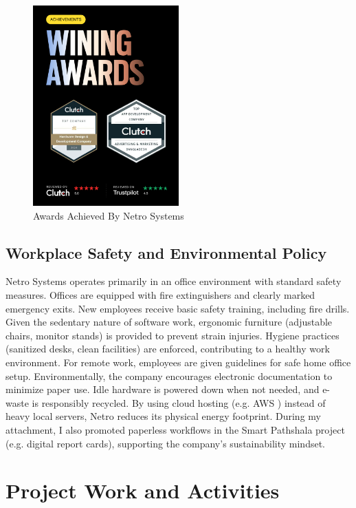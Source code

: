 \documentclass[12pt,a4paper]{report}
\let\oldcite\cite
\renewcommand{\cite}[1]{\textcolor{impactcolor}{\oldcite{#1}}}
\begin{document}
\begin{figure}[h!]
\centering
    \includegraphics[width=0.5\textwidth]{Figures/awards.png}
    \caption{Awards Achieved By Netro Systems}
\end{figure}
\newpage

\section{Workplace Safety and Environmental Policy}
Netro Systems operates primarily in an office environment with standard safety measures. Offices are equipped with fire extinguishers and clearly marked emergency exits. New employees receive basic safety training, including fire drills. Given the sedentary nature of software work, ergonomic furniture (adjustable chairs, monitor stands) is provided to prevent strain injuries. Hygiene practices (sanitized desks, clean facilities) are enforced, contributing to a healthy work environment. For remote work, employees are given guidelines for safe home office setup. Environmentally, the company encourages electronic documentation to minimize paper use. Idle hardware is powered down when not needed, and e-waste is responsibly recycled. By using cloud hosting (e.g. AWS \cite{ref7}) instead of heavy local servers, Netro reduces its physical energy footprint. During my attachment, I also promoted paperless workflows in the Smart Pathshala project (e.g. digital report cards), supporting the company’s sustainability mindset.

\chapter{Project Work and Activities}
\end{document}

